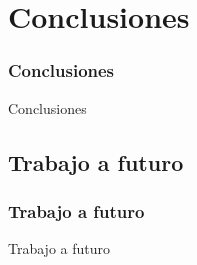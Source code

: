 \section{Conclusiones}

\begin{frame}
    \frametitle{Conclusiones}
    Conclusiones
\end{frame}

\subsection{Trabajo a futuro}
\begin{frame}
    \frametitle{Trabajo a futuro}
    Trabajo a futuro
\end{frame}
